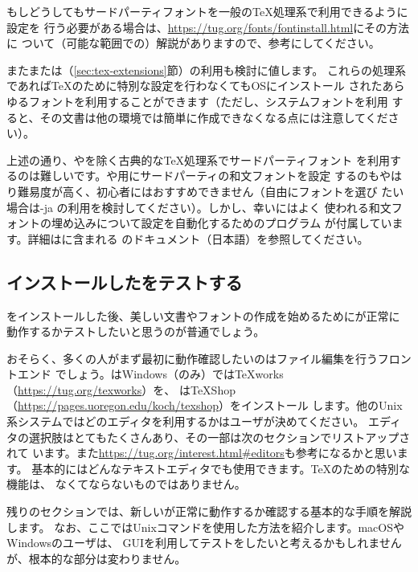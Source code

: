 \documentclass[uplatex,dvipdfmx]{jsarticle}
\begin{document}
もしどうしてもサードパーティフォントを一般の\TeX 処理系で利用できるように設定を
行う必要がある場合は、\url{https://tug.org/fonts/fontinstall.html}にその方法に
ついて（可能な範囲での）解説がありますので、参考にしてください。

また\XeTeX または\LuaTeX （\ref{sec:tex-extensions}節）の利用も検討に値します。
これらの処理系であれば\TeX のために特別な設定を行わなくてもOSにインストール
されたあらゆるフォントを利用することができます（ただし、システムフォントを利用
すると、その文書は他の環境では簡単に作成できなくなる点には注意してください）。

\begin{janote}
上述の通り、\XeTeX や\LuaTeX を除く古典的な\TeX 処理系でサードパーティフォント
を利用するのは難しいです。\pTeX や\upTeX 用にサードパーティの和文フォントを設定
するのもやはり難易度が高く、初心者にはおすすめできません（自由にフォントを選び
たい場合は\LuaTeX-ja の利用を検討してください）。しかし、幸い\TL にはよく
使われる和文フォントの埋め込みについて設定を自動化するためのプログラム
が付属しています。詳細は\TL に含まれる
のドキュメント（日本語）を参照してください。
\end{janote}

\subsection{インストールした\TL をテストする}
\label{sec:test-install}

\TL をインストールした後、美しい文書やフォントの作成を始めるために\TL が正常に
動作するかテストしたいと思うのが普通でしょう。

おそらく、多くの人がまず最初に動作確認したいのはファイル編集を行うフロントエンド
でしょう。\TL はWindows（のみ）では{\TeX}works（\url{https://tug.org/texworks}）を、
\MacTeX は{\TeX}Shop（\url{https://pages.uoregon.edu/koch/texshop}）をインストール
します。他のUnix系システムではどのエディタを利用するかはユーザが決めてください。
エディタの選択肢はとてもたくさんあり、その一部は次のセクションでリストアップされて
います。また\url{https://tug.org/interest.html#editors}も参考になるかと思います。
基本的にはどんなテキストエディタでも使用できます。\TeX のための特別な機能は、
なくてならないものではありません。

残りのセクションでは、新しい\TL が正常に動作するか確認する基本的な手順を解説します。
なお、ここではUnixコマンドを使用した方法を紹介します。macOSやWindowsのユーザは、
GUIを利用してテストをしたいと考えるかもしれませんが、根本的な部分は変わりません。
\end{document}
